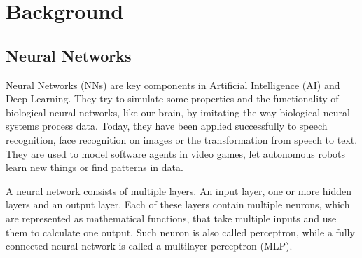 \chapter{Background}

  \section{Neural Networks}

    Neural Networks (NNs) are key components in Artificial Intelligence (AI) and Deep Learning.
    They try to simulate some properties and the functionality of biological neural networks, like our brain, by imitating the way biological neural systems process data.
    Today, they have been applied successfully to speech recognition, face recognition on images or the transformation from speech to text.
    They are used to model software agents in video games, let autonomous robots learn new things or find patterns in data.

    A neural network consists of multiple layers.
    An input layer, one or more hidden layers and an output layer.
    Each of these layers contain multiple neurons, which are represented as mathematical functions, that take multiple inputs and use them to calculate one output.
    Such neuron is also called perceptron, while a fully connected neural network is called a multilayer perceptron (MLP).

